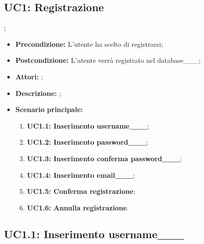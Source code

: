 \subsection{ UC1: Registrazione}
;
\begin{itemize}
	\item \textbf{Precondizione:} L'utente ha scelto di registrarsi;
	\item \textbf{Postcondizione:} L'utente verrà registrato nel database___;
	\item \textbf{Attori:} ;
	\item \textbf{Descrizione:} ;
	\item \textbf{Scenario principale:}
	\begin{enumerate}
		\item \textbf{ UC1.1: Inserimento username___};
		\item \textbf{ UC1.2: Inserimento password___};
		\item \textbf{ UC1.3: Inserimento conferma password___};
		\item \textbf{ UC1.4: Inserimento email___};
		\item \textbf{ UC1.5: Conferma registrazione};
		\item \textbf{ UC1.6: Annulla registrazione}.
	\end{enumerate}
\end{itemize}
\subsection{ UC1.1: Inserimento username___}

